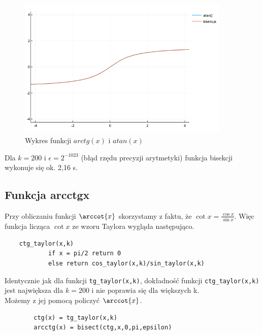\documentclass[11pt,a4paper]{article}
\begin{document}
    \begin{figure}[h]
        \includegraphics[width=0.9\textwidth]{bisect.png}
        \caption{Wykres funkcji $arctg(x)$ i $atan(x)$}
    \end{figure}


    Dla $k=200$ i $\epsilon=2^{-1023}$ (błąd rzędu precyzji arytmetyki) funkcja bisekcji wykonuje się ok. 2,16 s.


    \subsection{Funkcja arcctgx}
    Przy obliczaniu funkcji $\arccot{x}$ skorzystamy z faktu, że $\cot{x} = \frac{\cos{x}}{\sin{x}}$. Więc funkcja licząca $\cot{x}$ ze wzoru Taylora wygląda następująco.

    \begin{verbatim}
    ctg_taylor(x,k)
            if x = pi/2 return 0
            else return cos_taylor(x,k)/sin_taylor(x,k)
    \end{verbatim}

    Identycznie jak dla funkcji \verb!tg_taylor(x,k)!, dokładność funkcji \verb!ctg_taylor(x,k)! jest największa dla $k=200$ i nie poprawia się dla większych k.\\
    Możemy z jej pomocą policzyć $\arccot{x}$.
    \begin{verbatim}
        ctg(x) = tg_taylor(x,k)
        arcctg(x) = bisect(ctg,x,0,pi,epsilon)
    \end{verbatim}
\end{document}
